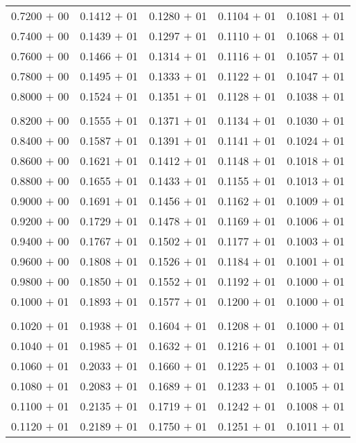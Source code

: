 \documentclass[a4paper,11pt]{article}
\begin{document}
\begin{center}
\begin{longtable}{ c c c c c }
0.7200 $+$ 00 & 0.1412 $+$ 01 & 0.1280 $+$ 01 & 0.1104 $+$ 01 & 0.1081 $+$ 01 \\
0.7400 $+$ 00 & 0.1439 $+$ 01 & 0.1297 $+$ 01 & 0.1110 $+$ 01 & 0.1068 $+$ 01 \\
0.7600 $+$ 00 & 0.1466 $+$ 01 & 0.1314 $+$ 01 & 0.1116 $+$ 01 & 0.1057 $+$ 01 \\
0.7800 $+$ 00 & 0.1495 $+$ 01 & 0.1333 $+$ 01 & 0.1122 $+$ 01 & 0.1047 $+$ 01 \\
0.8000 $+$ 00 & 0.1524 $+$ 01 & 0.1351 $+$ 01 & 0.1128 $+$ 01 & 0.1038 $+$ 01 \\
\\
0.8200 $+$ 00 & 0.1555 $+$ 01 & 0.1371 $+$ 01 & 0.1134 $+$ 01 & 0.1030 $+$ 01 \\
0.8400 $+$ 00 & 0.1587 $+$ 01 & 0.1391 $+$ 01 & 0.1141 $+$ 01 & 0.1024 $+$ 01 \\
0.8600 $+$ 00 & 0.1621 $+$ 01 & 0.1412 $+$ 01 & 0.1148 $+$ 01 & 0.1018 $+$ 01 \\
0.8800 $+$ 00 & 0.1655 $+$ 01 & 0.1433 $+$ 01 & 0.1155 $+$ 01 & 0.1013 $+$ 01 \\
0.9000 $+$ 00 & 0.1691 $+$ 01 & 0.1456 $+$ 01 & 0.1162 $+$ 01 & 0.1009 $+$ 01 \\
0.9200 $+$ 00 & 0.1729 $+$ 01 & 0.1478 $+$ 01 & 0.1169 $+$ 01 & 0.1006 $+$ 01 \\
0.9400 $+$ 00 & 0.1767 $+$ 01 & 0.1502 $+$ 01 & 0.1177 $+$ 01 & 0.1003 $+$ 01 \\
0.9600 $+$ 00 & 0.1808 $+$ 01 & 0.1526 $+$ 01 & 0.1184 $+$ 01 & 0.1001 $+$ 01 \\
0.9800 $+$ 00 & 0.1850 $+$ 01 & 0.1552 $+$ 01 & 0.1192 $+$ 01 & 0.1000 $+$ 01 \\
0.1000 $+$ 01 & 0.1893 $+$ 01 & 0.1577 $+$ 01 & 0.1200 $+$ 01 & 0.1000 $+$ 01 \\
\\
0.1020 $+$ 01 & 0.1938 $+$ 01 & 0.1604 $+$ 01 & 0.1208 $+$ 01 & 0.1000 $+$ 01 \\
0.1040 $+$ 01 & 0.1985 $+$ 01 & 0.1632 $+$ 01 & 0.1216 $+$ 01 & 0.1001 $+$ 01 \\
0.1060 $+$ 01 & 0.2033 $+$ 01 & 0.1660 $+$ 01 & 0.1225 $+$ 01 & 0.1003 $+$ 01 \\
0.1080 $+$ 01 & 0.2083 $+$ 01 & 0.1689 $+$ 01 & 0.1233 $+$ 01 & 0.1005 $+$ 01 \\
0.1100 $+$ 01 & 0.2135 $+$ 01 & 0.1719 $+$ 01 & 0.1242 $+$ 01 & 0.1008 $+$ 01 \\
0.1120 $+$ 01 & 0.2189 $+$ 01 & 0.1750 $+$ 01 & 0.1251 $+$ 01 & 0.1011 $+$ 01 \\

\end{longtable}
\end{center}
\end{document}
